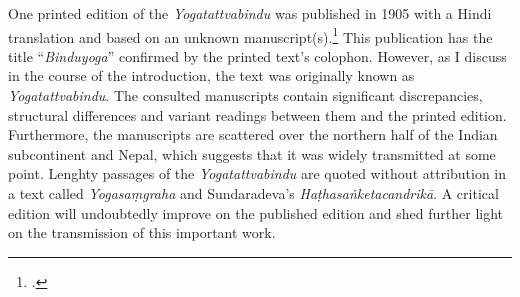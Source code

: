 One printed edition of the \textit{Yogatattvabindu} was published in 1905 with a Hindi translation and based on an unknown manuscript(s).\footnote{.} This publication has the title ``\textit{Binduyoga}'' confirmed by the printed text’s colophon. However, as I discuss in the course of the introduction, the text was originally known as \textit{Yogatattvabindu}. The consulted manuscripts contain significant discrepancies, structural differences and variant readings between them and the printed edition. Furthermore, the manuscripts are scattered over the northern half of the Indian subcontinent and Nepal, which suggests that it was widely transmitted at some point. Lenghty passages of the \textit{Yogatattvabindu} are quoted without attribution in a text called \textit{Yogasaṃgraha} and Sundaradeva’s \textit{Haṭhasaṅketacandrikā}. A critical edition will undoubtedly improve on the published edition and shed further light on the transmission of this important work.

